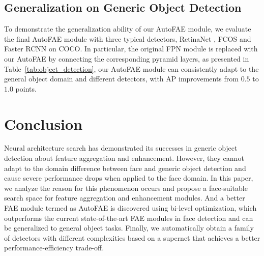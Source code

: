 \documentclass[sigconf]{acmart}
\begin{document}
\subsection{Generalization on Generic Object Detection}
To demonstrate the generalization ability of our AutoFAE module, we evaluate the final AutoFAE module with three typical detectors, RetinaNet \cite{lin2017focal}, FCOS \cite{tian2019fcos} and Faster RCNN \cite{ren2015faster} on COCO. In particular, the original FPN module is replaced with our AutoFAE by connecting the corresponding pyramid layers, as presented in Table~\ref{tab:object_detection}, our AutoFAE module can consistently adapt to the general object domain and different detectors, with AP improvements from $0.5$ to $1.0$ points.
\begin{table}[!t]
    \centering
    \caption{The generalization of AutoFAE on generic object detection dataset \textit{i.e.} COCO.}
    \label{tab:object_detection}
\end{table}


\section{Conclusion}
Neural architecture search has demonstrated its successes in generic object detection about feature aggregation and enhancement. However, they cannot adapt to the domain difference between face and generic object detection and cause severe performance drops when applied to the face domain. In this paper, we analyze the reason for this phenomenon occurs and propose a face-suitable search space for feature aggregation and enhancement modules. And a better FAE module termed as AutoFAE is discovered using bi-level optimization, which outperforms the current state-of-the-art FAE modules in face detection and can be generalized to general object tasks. Finally, we automatically obtain a family of detectors with different complexities based on a supernet that achieves a better performance-efficiency trade-off.


\balance

\end{document}
